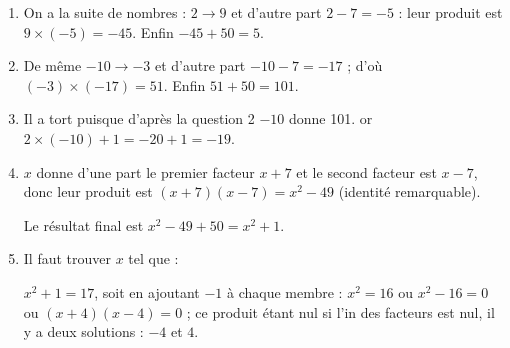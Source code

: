 
\medskip
 
% 
%
%
%
%

\medskip

\begin{enumerate}
\item %
On a la suite de nombres : $2 \to 9$ et d'autre part $2 - 7 = - 5$ : leur produit est $9 \times (- 5) = - 45$. Enfin $- 45 + 50 = 5$.
\item %
De même $- 10 \to - 3$ et d'autre part $- 10 - 7 = - 17$ ; d'où $(- 3) \times (- 17) = 51$. Enfin $51 + 50 = 101$.
\item %


Il a tort puisque d'après la question 2 $- 10$ donne 101. or $2 \times (- 10) + 1 = - 20 + 1 = - 19$. 
\item %
$x$ donne d'une part le premier facteur $x + 7$ et le second facteur est $x - 7$, donc leur produit  est $(x + 7)(x - 7) = x^2 - 49$ (identité remarquable).

Le résultat final est $x^2 - 49 + 50 = x^2 + 1$.
\item %
Il faut trouver $x$ tel que :

$x^2 + 1 = 17$, soit en ajoutant $- 1$ à chaque membre : $x^2 = 16$ ou $x^2 - 16 = 0$ ou $(x + 4)(x - 4) = 0$ ; ce produit étant nul si l'in des facteurs est nul, il y a deux solutions : $- 4$ et $4$.
\end{enumerate}

\bigskip

